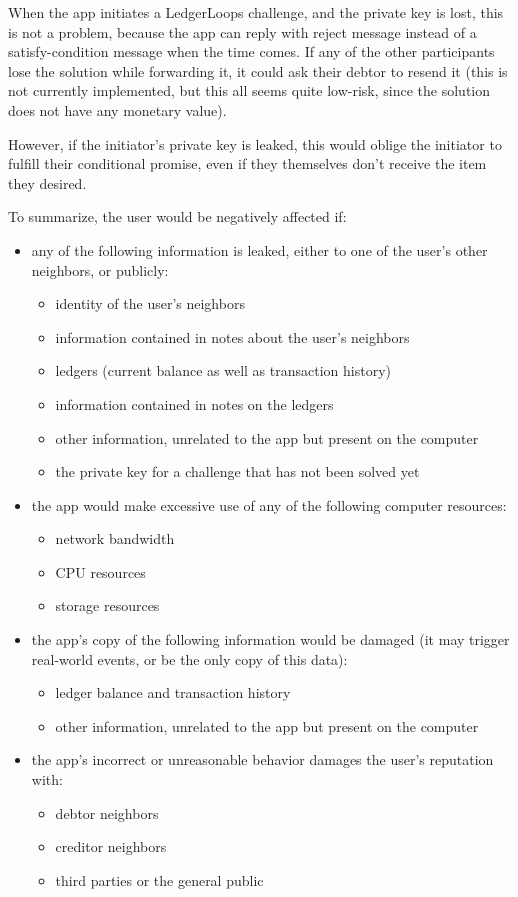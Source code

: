 \documentclass[11pt,twoside,a4paper]{article}
\begin{document}
When the app initiates a LedgerLoops challenge, and the private key is lost, this is not a problem, because the app can reply with reject message instead of a satisfy-condition message when the time comes. If any of the other participants lose the solution while forwarding it, it could ask their debtor to resend it (this is not currently implemented, but this all seems quite low-risk, since the solution does not have any monetary value).

However, if the initiator's private key is leaked, this would oblige the initiator to fulfill their conditional promise, even if they themselves don't receive the item they desired.

To summarize, the user would be negatively affected if:

\begin{itemize}
\item any of the following information is leaked, either to one of the user's other neighbors, or publicly:
  \begin{itemize}
  \item identity of the user's neighbors
  \item information contained in notes about the user's neighbors
  \item ledgers (current balance as well as transaction history)
  \item information contained in notes on the ledgers
  \item other information, unrelated to the app but present on the computer
  \item the private key for a challenge that has not been solved yet
  \end{itemize}
  
\item the app would make excessive use of any of the following computer resources:
  \begin{itemize}
  \item network bandwidth
  \item CPU resources
  \item storage resources
  \end{itemize}
  
\item the app's copy of the following information would be damaged (it may trigger real-world events, or be the only copy of this data):
  \begin{itemize}
  \item ledger balance and transaction history
  \item other information, unrelated to the app but present on the computer
  \end{itemize}
  
\item the app's incorrect or unreasonable behavior damages the user's reputation with:
  \begin{itemize}
  \item debtor neighbors
  \item creditor neighbors
  \item third parties or the general public
  \end{itemize}
\end{itemize}
\end{document}

